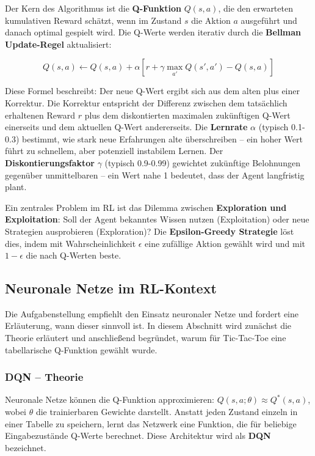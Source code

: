 Der Kern des Algorithmus ist die \textbf{Q-Funktion} $Q(s, a)$, die den erwarteten kumulativen Reward schätzt, wenn im Zustand $s$ die Aktion $a$ ausgeführt und danach optimal gespielt wird. Die Q-Werte werden iterativ durch die \textbf{Bellman Update-Regel} aktualisiert:

\begin{equation}
Q(s, a) \leftarrow Q(s, a) + \alpha \left[ r + \gamma \max_{a'} Q(s', a') - Q(s, a) \right]
\end{equation}

Diese Formel beschreibt: Der neue Q-Wert ergibt sich aus dem alten plus einer Korrektur. Die Korrektur entspricht der Differenz zwischen dem tatsächlich erhaltenen Reward $r$ plus dem diskontierten maximalen zukünftigen Q-Wert einerseits und dem aktuellen Q-Wert andererseits. Die \textbf{Lernrate} $\alpha$ (typisch 0.1-0.3) bestimmt, wie stark neue Erfahrungen alte überschreiben -- ein hoher Wert führt zu schnellem, aber potenziell instabilem Lernen. Der \textbf{Diskontierungsfaktor} $\gamma$ (typisch 0.9-0.99) gewichtet zukünftige Belohnungen gegenüber unmittelbaren -- ein Wert nahe 1 bedeutet, dass der Agent langfristig plant.

Ein zentrales Problem im \ac{RL} ist das Dilemma zwischen \textbf{Exploration und Exploitation}: Soll der Agent bekanntes Wissen nutzen (Exploitation) oder neue Strategien ausprobieren (Exploration)? Die \textbf{Epsilon-Greedy Strategie} löst dies, indem mit Wahrscheinlichkeit $\epsilon$ eine zufällige Aktion gewählt wird und mit $1-\epsilon$ die nach Q-Werten beste.

\subsection{Neuronale Netze im \ac{RL}-Kontext}

Die Aufgabenstellung empfiehlt den Einsatz neuronaler Netze und fordert eine Erläuterung, wann dieser sinnvoll ist. In diesem Abschnitt wird zunächst die Theorie erläutert und anschließend begründet, warum für Tic-Tac-Toe eine tabellarische Q-Funktion gewählt wurde.

\subsubsection{\ac{DQN} -- Theorie}

Neuronale Netze können die Q-Funktion approximieren: $Q(s, a; \theta) \approx Q^*(s, a)$, wobei $\theta$ die trainierbaren Gewichte darstellt. Anstatt jeden Zustand einzeln in einer Tabelle zu speichern, lernt das Netzwerk eine Funktion, die für beliebige Eingabezustände Q-Werte berechnet. Diese Architektur wird als \textbf{\ac{DQN}} bezeichnet.

